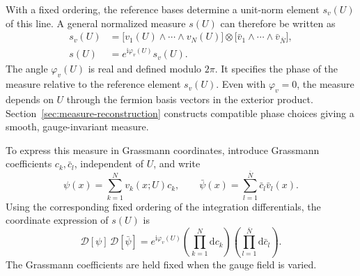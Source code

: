 \documentclass[11pt,a4paper]{article}
\theoremstyle{remark}
\newcommand{\dd}{\mathrm d}
\newcommand{\ii}{\mathrm i}
\begin{document}
With a fixed ordering, the reference bases determine
a unit-norm element \(s_v(U)\) of this line. A general
normalized measure \(s(U)\) can therefore be written as
\begin{equation}
 \begin{split}
 s_v(U)
 &=\bigl[v_1(U)\wedge\cdots\wedge v_N(U)\bigr]
   \otimes
   \bigl[\bar v_1\wedge\cdots\wedge\bar v_{\bar N}\bigr],
 \\
 s(U)&=e^{\ii\varphi_v(U)}s_v(U).
 \end{split}
 \label{eq:measure-exterior}
\end{equation}
The angle \(\varphi_v(U)\) is real and defined modulo
\(2\pi\). It specifies the phase of the measure relative
to the reference element \(s_v(U)\).
Even with \(\varphi_v=0\), the measure depends on \(U\)
through the fermion basis vectors in the exterior product.
Section~\ref{sec:measure-reconstruction} constructs
compatible phase choices giving a smooth, gauge-invariant
measure.

To express this measure in Grassmann coordinates,
introduce Grassmann coefficients \(c_k,\bar c_l\), independent of
\(U\), and write
\begin{equation}
 \psi(x)=\sum_{k=1}^N v_k(x;U)c_k,\qquad
 \bar\psi(x)=\sum_{l=1}^{\bar N}\bar c_l\bar v_l(x).
 \label{eq:fermion-coordinate-expansion}
\end{equation}
Using the corresponding fixed ordering of the integration
differentials, the coordinate expression of \(s(U)\) is
\begin{equation}
 \mathcal D[\psi]\,\mathcal D[\bar\psi]
 =e^{\ii\varphi_v(U)}
   \left(\prod_{k=1}^N\dd c_k\right)
   \left(\prod_{l=1}^{\bar N}\dd\bar c_l\right).
 \label{eq:measure-coordinates}
\end{equation}
The Grassmann coefficients are held fixed when the gauge
field is varied.
\end{document}
